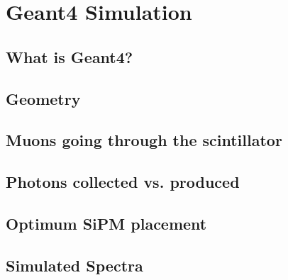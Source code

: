 \chapter{Geant4 Simulation}

\section{What is Geant4?}

\section{Geometry}

\section{Muons going through the scintillator}

\section{Photons collected vs. produced}

\section{Optimum SiPM placement}

\section{Simulated Spectra}